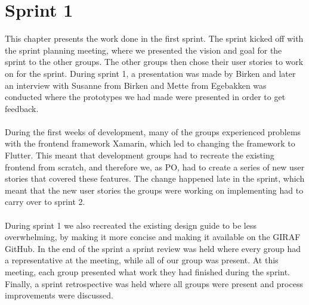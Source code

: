 \chapter{Sprint 1}
This chapter presents the work done in the first sprint.
The sprint kicked off with the sprint planning meeting, where we presented the vision and goal for the sprint to the other groups.
The other groups then chose their user stories to work on for the sprint.
During sprint 1, a presentation was made by Birken and later an interview with Susanne from Birken and Mette from Egebakken was conducted where the prototypes we had made were presented in order to get feedback.
\\\\
During the first weeks of development, many of the groups experienced problems with the frontend framework Xamarin, which led to changing the framework to Flutter.
This meant that development groups had to recreate the existing frontend from scratch, and therefore we, as PO, had to create a series of new user stories that covered these features.
The change happened late in the sprint, which meant that the new user stories the groups were working on implementing had to carry over to sprint 2.
\\\\
During sprint 1 we also recreated the existing design guide to be less overwhelming, by making it more concise and making it available on the GIRAF GitHub.
In the end of the sprint a sprint review was held where every group had a representative at the meeting, while all of our group was present.
At this meeting, each group presented what work they had finished during the sprint.
Finally, a sprint retrospective was held where all groups were present and process improvements were discussed.
